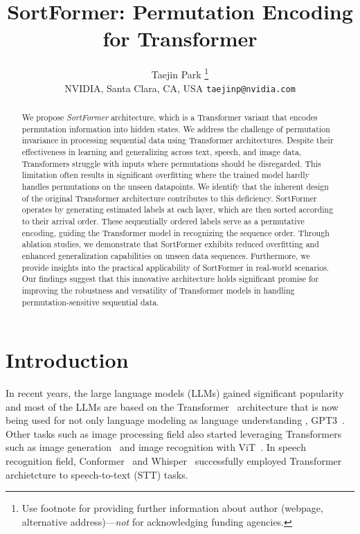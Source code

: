 \documentclass{article}
\title{SortFormer: Permutation Encoding for Transformer}
\author{%
  Taejin Park \thanks{Use footnote for providing further information
    about author (webpage, alternative address)---\emph{not} for acknowledging
    funding agencies.} \\
NVIDIA, Santa Clara, CA, USA
  \texttt{taejinp@nvidia.com} \\
}
\begin{document}
\maketitle


\begin{abstract}
  We propose \textit{SortFormer} architecture, which is a Transformer variant that encodes permutation information into hidden states. We address the challenge of permutation invariance 
  in processing sequential data using Transformer architectures. Despite their effectiveness in learning and generalizing across text, speech, and image data, 
  Transformers struggle with inputs where permutations should be disregarded. This limitation often results in significant overfitting where the trained model hardly handles 
  permutations on the unseen datapoints. We identify that the inherent design of the original Transformer architecture contributes to this deficiency.
  SortFormer operates by generating estimated labels at each layer, which are then sorted according to their arrival order. These sequentially ordered labels serve as
  a permutative encoding, guiding the Transformer model in recognizing the sequence order. 
  Through ablation studies, we demonstrate that SortFormer exhibits reduced overfitting and enhanced generalization capabilities on unseen data sequences.
  Furthermore, we provide insights into the practical applicability of SortFormer in real-world scenarios. 
  Our findings suggest that this innovative architecture holds significant promise for improving the robustness and versatility of 
  Transformer models in handling permutation-sensitive sequential data.
\end{abstract}


\section{Introduction}
In recent years, the large language models (LLMs) \cite{radford2019language, rao2022megatron} gained significant popularity and most of the LLMs are based on the Transformer~\cite{vaswani2017attention}
architecture that is now being used for not only language modeling
as language understanding \cite{devlin2018bert, raffel2019learning}, GPT3~\cite{brown2020gpt3}. Other tasks such as image processing field also started leveraging
Transformers such as image generation~\cite{parmar2018image} and image recognition with ViT~\cite{dosovitskiy2020image}. In speech recognition field, Conformer~\cite{gulati2020conformer}
and Whisper~\cite{radford2023robust} successfully employed Transformer archietcture to speech-to-text (STT) tasks.
\end{document}
